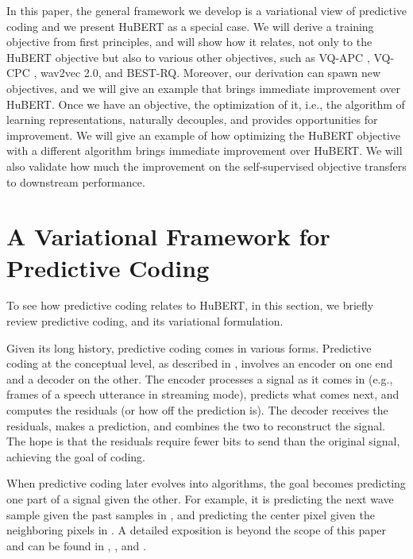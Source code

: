 \documentclass[11pt,a4paper]{article}
\begin{document}
In this paper, the general framework we develop is a variational view of predictive coding and we present HuBERT as a special case.
We will derive a training objective from first principles, and will show how it relates, not only to the HuBERT objective but also to various other objectives, such as VQ-APC \citep{chung2020vector}, VQ-CPC \citep{niekerk2020vector}, wav2vec 2.0, and BEST-RQ.
Moreover, our derivation can spawn new objectives, and we will give an example that brings immediate improvement over HuBERT.
Once we have an objective, the optimization of it, i.e., the algorithm of learning representations, naturally decouples, and provides opportunities for improvement.
We will give an example of how optimizing the HuBERT objective with a different algorithm brings immediate improvement over HuBERT.
We will also validate how much the improvement on the self-supervised objective transfers to downstream performance.

%
%
%
%
%
%
%
%
%
%
%
%
%

%
%
%



%
%
%
%
%
%
%
%
%
%
%
%
%
%
%
%
%

\section{A Variational Framework for Predictive Coding}
\label{sec:predcoding}

To see how predictive coding relates to HuBERT,
in this section, we briefly review predictive coding,
and its variational formulation.

Given its long history, predictive coding comes in various forms.
Predictive coding at the conceptual level, as described in \citet{elias1955predictive}, involves an encoder on one end and a decoder on the other.
The encoder processes a signal as it comes in (e.g., frames of a speech utterance in streaming mode), predicts what comes next, and computes the residuals (or how off the prediction is).
The decoder receives the residuals, makes a prediction, and combines the two to reconstruct the signal.
The hope is that the residuals require fewer bits to send than the original signal, achieving the goal of coding.

When predictive coding later evolves into algorithms, the goal becomes predicting one part of a signal given the other.
For example, it is predicting the next wave sample given the past samples in \citet{atal1971speech}, and predicting the center pixel given the neighboring pixels in \citet{srinivasan1982predictive}.
A detailed exposition is beyond the scope of this paper and can be found in \citet{makhoul1975linear}, \citet{huang2011predictive}, and \citet{spratling2017review}.
\end{document}
